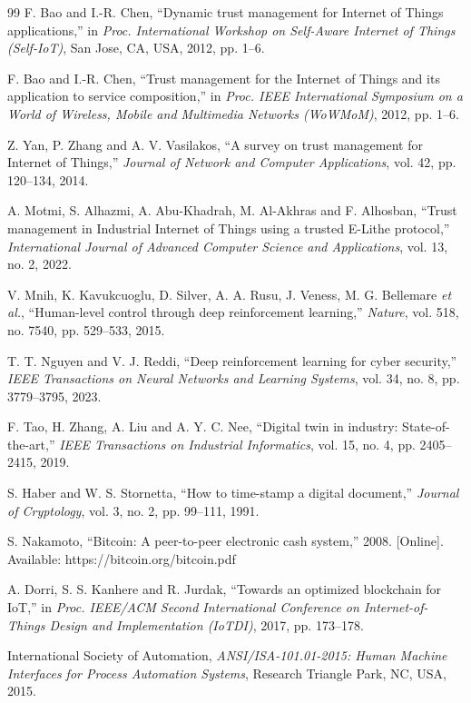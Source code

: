 \begin{thebibliography}{99}
 F. Bao and I.-R. Chen, ``Dynamic trust management for Internet of Things applications,'' in \emph{Proc. International Workshop on Self-Aware Internet of Things (Self-IoT)}, San Jose, CA, USA, 2012, pp. 1--6.

 F. Bao and I.-R. Chen, ``Trust management for the Internet of Things and its application to service composition,'' in \emph{Proc. IEEE International Symposium on a World of Wireless, Mobile and Multimedia Networks (WoWMoM)}, 2012, pp. 1--6.

 Z. Yan, P. Zhang and A. V. Vasilakos, ``A survey on trust management for Internet of Things,'' \emph{Journal of Network and Computer Applications}, vol. 42, pp. 120--134, 2014.

 A. Motmi, S. Alhazmi, A. Abu-Khadrah, M. Al-Akhras and F. Alhosban, ``Trust management in Industrial Internet of Things using a trusted E-Lithe protocol,'' \emph{International Journal of Advanced Computer Science and Applications}, vol. 13, no. 2, 2022.

 V. Mnih, K. Kavukcuoglu, D. Silver, A. A. Rusu, J. Veness, M. G. Bellemare \emph{et al.}, ``Human-level control through deep reinforcement learning,'' \emph{Nature}, vol. 518, no. 7540, pp. 529--533, 2015.

 T. T. Nguyen and V. J. Reddi, ``Deep reinforcement learning for cyber security,'' \emph{IEEE Transactions on Neural Networks and Learning Systems}, vol. 34, no. 8, pp. 3779--3795, 2023.

 F. Tao, H. Zhang, A. Liu and A. Y. C. Nee, ``Digital twin in industry: State-of-the-art,'' \emph{IEEE Transactions on Industrial Informatics}, vol. 15, no. 4, pp. 2405--2415, 2019.

 S. Haber and W. S. Stornetta, ``How to time-stamp a digital document,'' \emph{Journal of Cryptology}, vol. 3, no. 2, pp. 99--111, 1991.

 S. Nakamoto, ``Bitcoin: A peer-to-peer electronic cash system,'' 2008. [Online]. Available: https://bitcoin.org/bitcoin.pdf

 A. Dorri, S. S. Kanhere and R. Jurdak, ``Towards an optimized blockchain for IoT,'' in \emph{Proc. IEEE/ACM Second International Conference on Internet-of-Things Design and Implementation (IoTDI)}, 2017, pp. 173--178.

 International Society of Automation, \emph{ANSI/ISA-101.01-2015: Human Machine Interfaces for Process Automation Systems}, Research Triangle Park, NC, USA, 2015.

\end{thebibliography}
\endgroup
